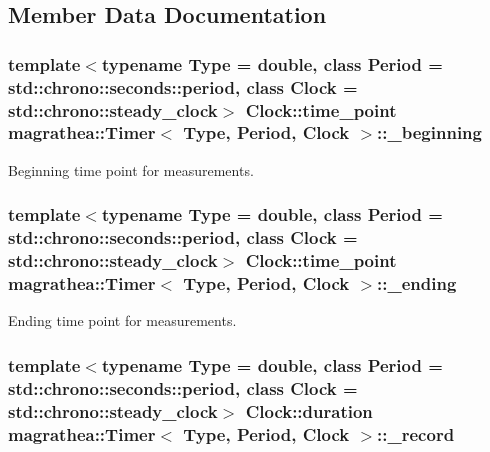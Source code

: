 \subsection{Member Data Documentation}
\hypertarget{exceptionmagrathea_1_1Timer_a6c71f8b0c5557836e48043ff6bad791d}{
\subsubsection[{\-\_\-beginning}]{\setlength{\rightskip}{0pt plus 5cm}template$<$typename Type = double, class Period = std\-::chrono\-::seconds\-::period, class Clock = std\-::chrono\-::steady\-\_\-clock$>$ Clock\-::time\-\_\-point {\bf magrathea\-::\-Timer}$<$ Type, Period, Clock $>$\-::\-\_\-beginning\hspace{0.3cm}{\ttfamily [protected]}}}\label{exceptionmagrathea_1_1Timer_a6c71f8b0c5557836e48043ff6bad791d}


Beginning time point for measurements. 

\hypertarget{exceptionmagrathea_1_1Timer_a005c041aa6b61e1f6c365fa6c4d7151d}{
\subsubsection[{\-\_\-ending}]{\setlength{\rightskip}{0pt plus 5cm}template$<$typename Type = double, class Period = std\-::chrono\-::seconds\-::period, class Clock = std\-::chrono\-::steady\-\_\-clock$>$ Clock\-::time\-\_\-point {\bf magrathea\-::\-Timer}$<$ Type, Period, Clock $>$\-::\-\_\-ending\hspace{0.3cm}{\ttfamily [protected]}}}\label{exceptionmagrathea_1_1Timer_a005c041aa6b61e1f6c365fa6c4d7151d}


Ending time point for measurements. 

\hypertarget{exceptionmagrathea_1_1Timer_a1fb0110e524e12e39685ef9e5312d3f4}{
\subsubsection[{\-\_\-record}]{\setlength{\rightskip}{0pt plus 5cm}template$<$typename Type = double, class Period = std\-::chrono\-::seconds\-::period, class Clock = std\-::chrono\-::steady\-\_\-clock$>$ Clock\-::duration {\bf magrathea\-::\-Timer}$<$ Type, Period, Clock $>$\-::\-\_\-record\hspace{0.3cm}{\ttfamily [protected]}}}\label{exceptionmagrathea_1_1Timer_a1fb0110e524e12e39685ef9e5312d3f4}


